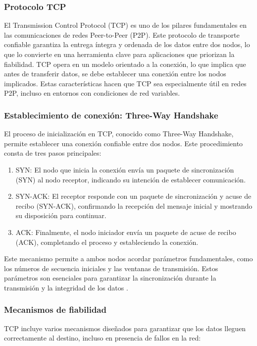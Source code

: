 \subsubsection{Protocolo TCP}
El Transmission Control Protocol (TCP) es uno de los pilares fundamentales en las comunicaciones de redes Peer-to-Peer (P2P). Este protocolo de transporte confiable garantiza la entrega íntegra y ordenada de los datos entre dos nodos, lo que lo convierte en una herramienta clave para aplicaciones que priorizan la fiabilidad. TCP opera en un modelo orientado a la conexión, lo que implica que antes de transferir datos, se debe establecer una conexión entre los nodos implicados. Estas características hacen que TCP sea especialmente útil en redes P2P, incluso en entornos con condiciones de red variables.

\subsubsection*{Establecimiento de conexión: Three-Way Handshake}
El proceso de inicialización en TCP, conocido como Three-Way Handshake, permite establecer una conexión confiable entre dos nodos. Este procedimiento consta de tres pasos principales:

\begin{enumerate}
\item SYN: El nodo que inicia la conexión envía un paquete de sincronización (SYN) al nodo receptor, indicando su intención de establecer comunicación.
\item SYN-ACK: El receptor responde con un paquete de sincronización y acuse de recibo (SYN-ACK), confirmando la recepción del mensaje inicial y mostrando su disposición para continuar.
\item ACK: Finalmente, el nodo iniciador envía un paquete de acuse de recibo (ACK), completando el proceso y estableciendo la conexión.
\end{enumerate}
Este mecanismo permite a ambos nodos acordar parámetros fundamentales, como los números de secuencia iniciales y las ventanas de transmisión. Estos parámetros son esenciales para garantizar la sincronización durante la transmisión y la integridad de los datos \cite{stevens1994tcp}.

\subsubsection*{Mecanismos de fiabilidad}
TCP incluye varios mecanismos diseñados para garantizar que los datos lleguen correctamente al destino, incluso en presencia de fallos en la red:

